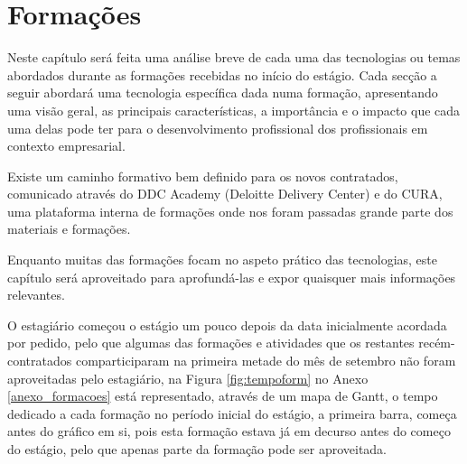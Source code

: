 \section{Formações}\label{sec:formacoes}

    Neste capítulo será feita uma análise breve de cada uma das tecnologias ou temas abordados durante as formações recebidas no início do estágio. Cada secção a seguir abordará uma tecnologia específica dada numa formação, apresentando uma visão geral, as principais características, a importância e o impacto que cada uma delas pode ter para o desenvolvimento profissional dos profissionais em contexto empresarial.

    Existe um caminho formativo bem definido para os novos contratados, comunicado através do DDC Academy (Deloitte Delivery Center) e do CURA, uma plataforma interna de formações onde nos foram passadas grande parte dos materiais e formações.

    Enquanto muitas das formações focam no aspeto prático das tecnologias, este capítulo será aproveitado para aprofundá-las e expor quaisquer mais informações relevantes.

    O estagiário começou o estágio um pouco depois da data inicialmente acordada por pedido, pelo que algumas das formações e atividades que os restantes recém-contratados comparticiparam na primeira metade do mês de setembro não foram aproveitadas pelo estagiário, na Figura \ref{fig:tempoform} no Anexo \ref{anexo_formacoes} está representado, através de um mapa de Gantt, o tempo dedicado a cada formação no período inicial do estágio, a primeira barra, começa antes do gráfico em si, pois esta formação estava já em decurso antes do começo do estágio, pelo que apenas parte da formação pode ser aproveitada.

